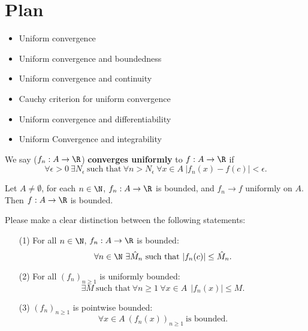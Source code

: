 \section{Plan}

\begin{itemize}
    \item Uniform convergence
    \item Uniform convergence and boundedness
    \item Uniform convergence and continuity
    \item Cauchy criterion for uniform convergence
    \item Uniform convergence and differentiability
    \item Uniform Convergence and integrability
\end{itemize}

\begin{definition}
    We say (\( {f}_{n} : A \to \R  \)) \textbf{converges uniformly} to \( f: A \to \R  \) if 
    \[  \forall \epsilon > 0 \ \exists {N}_{\epsilon} \ \text{such that} \ \forall n > {N}_{\epsilon} \ \forall x \in A \ | {f}_{n}(x) - f(c) |  < \epsilon. \]
\end{definition}

\begin{theorem}
    Let \( A \neq \emptyset  \), for each \( n \in \N \), \( {f}_{n}: A \to \R  \) is bounded, and \( {f}_{n} \to f  \) uniformly on \( A  \). Then \( f : A \to \R  \) is bounded.
\end{theorem}

\begin{remark}
    Please make a clear distinction between the following statements:
    \begin{enumerate}
        \item[(1)] For all \( n \in \N \), \( {f}_{n}: A \to \R  \) is bounded:
            \[  \forall n \in \N \ \exists \hat{M}_n \ \text{such that} \ | {f}_{n}(c) |  \leq \hat{M}_n. \]
        \item[(2)] For all \( ({f}_{n})_{n \geq 1 } \) is uniformly bounded:
            \[  \exists M \ \text{such that} \ \forall n \geq 1 \ \forall x \in A \ \ | {f}_{n}(x) |  \leq M.  \]
        \item[(3)] \( ({f}_{n})_{n \geq 1 } \) is pointwise bounded:
            \[ \forall x \in A \ ({f}_{n}(x))_{n \geq 1 } \ \text{is bounded}. \]
    \end{enumerate}
\end{remark}

